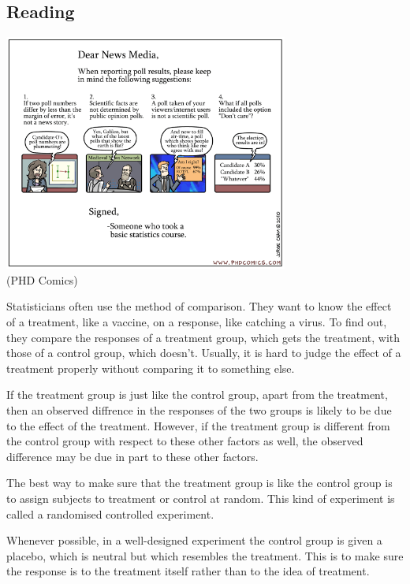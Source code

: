 



\subsection*{Reading}

\begin{center}
  \includegraphics[width=0.7\textwidth]{badstats}\\
  \small{(PHD Comics)}
\end{center}


Statisticians often use the method of comparison. They want to know the effect of a treatment, like a vaccine, on a response,
like catching a virus. To find out, they compare the responses of a treatment group, which gets the treatment, with those of a control
group, which doesn't. Usually, it is hard to judge the effect of a treatment properly without comparing it to something else.

If the treatment group is just like the control group, apart from the treatment, then an observed diffrence in the responses of the two groups
is likely to be due to the effect of the treatment. However, if the treatment group is different from the control group with respect to these
other factors as well, the observed difference may be due in part to these other factors.

The best way to make sure that the treatment group is like the control group is to assign subjects to treatment or control at random. This kind
of experiment is called a randomised controlled experiment.

Whenever possible, in a well-designed experiment the control group is given a placebo, which is neutral but which resembles the treatment.
This is to make sure the response is to the treatment itself rather than to the idea of treatment.

